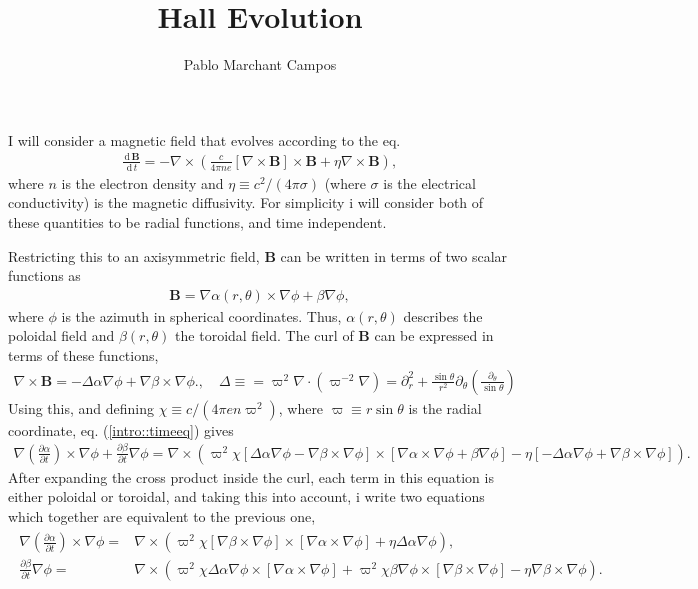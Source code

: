 \documentclass[letterpaper,10pt]{article}
\title{Hall Evolution}
\author{Pablo Marchant Campos}
\newcommand{\dd}{\,\mathrm{d}\,}
\newcommand{\pp}{\partial}
\renewcommand{\vec}[1]{\boldsymbol#1}
\begin{document}
\maketitle
I will consider a magnetic field that evolves according to the eq.
\begin{eqnarray}
\frac{\dd \vec{B}}{\dd t}=-\nabla\times\left(\frac{c}{4\pi ne}[\nabla\times\vec{B}]\times\vec{B}+\eta\nabla\times\vec{B}\right),\label{intro::timeeq}
\end{eqnarray}
where $n$ is the electron density and $\eta\equiv c^2/(4\pi\sigma)$ (where $\sigma$ is the electrical conductivity) is the magnetic diffusivity. For simplicity i will consider both of these quantities to be radial functions, and time independent.

Restricting this to an axisymmetric field, $\vec{B}$ can be written in terms of two scalar functions as
\begin{eqnarray}
\vec{B}=\nabla\alpha(r,\theta)\times\nabla\phi+\beta\nabla\phi,
\end{eqnarray}
where $\phi$ is the azimuth in spherical coordinates. Thus, $\alpha(r,\theta)$ describes the poloidal field and $\beta(r,\theta)$ the toroidal field. The curl of $\vec{B}$ can be expressed in terms of these functions,
\begin{eqnarray}
\nabla\times\vec{B}=-\Delta\alpha\nabla\phi+\nabla \beta\times\nabla\phi.,\quad \Delta\equiv=\varpi^2\nabla\cdot(\varpi^{-2}\nabla)=\pp_r^2+\frac{\sin\theta}{r^2}\pp_\theta\left(\frac{\pp_\theta}{\sin\theta}\right)
\end{eqnarray}
Using this, and defining $\chi\equiv c/(4\pi en\varpi^2)$, where $\varpi\equiv r\sin\theta$ is the radial coordinate, eq. (\ref{intro::timeeq}) gives
\begin{eqnarray}
\nabla\left(\frac{\pp \alpha}{\pp t}\right)\times\nabla\phi+\frac{\pp\beta}{\pp t}\nabla\phi=
\nabla\times\left(\varpi^2\chi[\Delta\alpha\nabla\phi-\nabla\beta\times\nabla\phi]\times[\nabla\alpha\times\nabla\phi+\beta\nabla\phi]-\eta[-\Delta\alpha\nabla\phi+\nabla\beta\times\nabla\phi]\right).
\end{eqnarray}
After expanding the cross product inside the curl, each term in this equation is either poloidal or toroidal, and taking this into account, i write two equations which together are equivalent to the previous one,
\begin{eqnarray}
\begin{aligned}
\nabla\left(\frac{\pp \alpha}{\pp t}\right)\times\nabla\phi=&
\nabla\times\left(\varpi^2\chi[\nabla\beta\times\nabla\phi]\times[\nabla\alpha\times\nabla\phi]+\eta\Delta\alpha\nabla\phi\right),\\
\frac{\pp\beta}{\pp t}\nabla\phi=&
\nabla\times\left(\varpi^2\chi\Delta\alpha\nabla\phi\times[\nabla\alpha\times\nabla\phi]+\varpi^2\chi\beta\nabla\phi\times[\nabla\beta\times\nabla\phi]-\eta\nabla\beta\times\nabla\phi\right).
\end{aligned}
\end{eqnarray}
\end{document}
